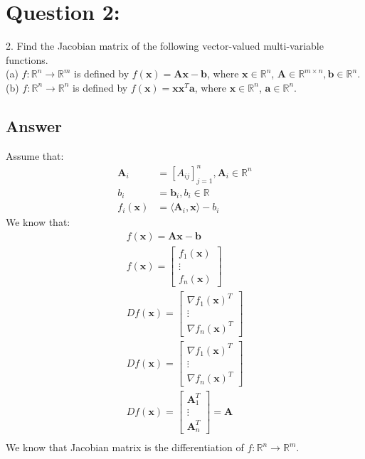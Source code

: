 \documentclass[a4paper,12pt]{article}
\newcommand{\R}{\mathbb{R}}
\begin{document}
\section*{Question 2:}
2. Find the Jacobian matrix of the following vector-valued multi-variable functions. \\
(a) \(f:\R^n \to \R^m \) is defined by \(f(\bm{x}) = \bm{A}\bm{x} - \bm{b}\), where \(\bm{x} \in \R^n\), \(\bm{A} \in \R^{m \times n}, \bm{b} \in \R^n\). \\
(b) \(f: \R^n \to \R^n\) is defined by \(f(\bm{x}) = \bm{x}\bm{x}^T\bm{a}\), where \(\bm{x} \in \R^n\), \(\bm{a} \in \R^n\).

\subsection*{Answer}
Assume that:
\begin{align*}
    \bm{A}_i &= [A_{ij}]_{j=1}^n, \bm{A}_i \in \R^n\\
    b_i &= \bm{b}_i, b_i \in \R  \\
    f_i(\bm{x}) &= \langle \bm{A}_i, \bm{x} \rangle - b_i 
\end{align*}
We know that:
\begin{align*}
    f(\bm{x}) = \bm{A}\bm{x}-\bm{b} \\
    f(\bm{x}) = \begin{bmatrix}f_1(\bm{x}) \\ \vdots \\ f_n(\bm{x})\end{bmatrix} \\
    Df(\bm{x}) = \begin{bmatrix}\nabla f_1(\bm{x})^T \\ \vdots \\ \nabla f_n(\bm{x})^T\end{bmatrix} \\
    Df(\bm{x}) = \begin{bmatrix}\nabla f_1(\bm{x})^T \\ \vdots \\ \nabla f_n(\bm{x})^T\end{bmatrix} \\
    Df(\bm{x}) = \begin{bmatrix}\bm{A}_1^T \\ \vdots \\ \bm{A}_n^T\end{bmatrix} = \bm{A} \\ 
\end{align*}
We know that Jacobian matrix is the differentiation of \(f:\R^n \to \R^m\).
\end{document}
